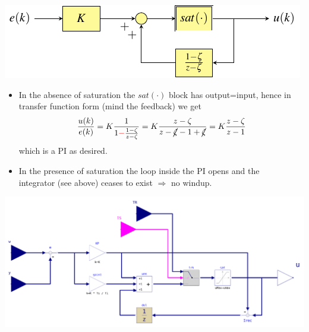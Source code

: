 \begin{frame}
\myPause
 \begin{center}
  \includegraphics[width=0.45\columnwidth]{./Unit-07/img/PI-AW-intFB.pdf}
 \end{center}
 \myPause
 \begin{itemize}[<+-| alert@+>]
  \item In the absence of saturation the $sat(\cdot)$ block has output=input, hence in transfer function form
        (mind the  feedback) we get
        \begin{displaymath}
         \frac{u(k)}{e(k)} = K \frac{1}{1\mathbf{\textcolor{red}{-}}\frac{1-\zeta}{z-\zeta}}
                           = K \frac{z-\zeta}{z-\cancel{\zeta}-1+\cancel{\zeta}}
                           = K \frac{z-\zeta}{z-1}
        \end{displaymath}
        which is a PI as desired.
  \item In the presence of saturation the loop inside the PI opens and the\\
        integrator (see above) ceases to exist  $\Rightarrow$ no windup.
  \end{itemize}
\end{frame}

\begin{frame}
\myPause
 \begin{center}
  \includegraphics[width=0.80\columnwidth]{./Unit-07/img/PI_POS.pdf}\\
 \end{center}
\end{frame}

